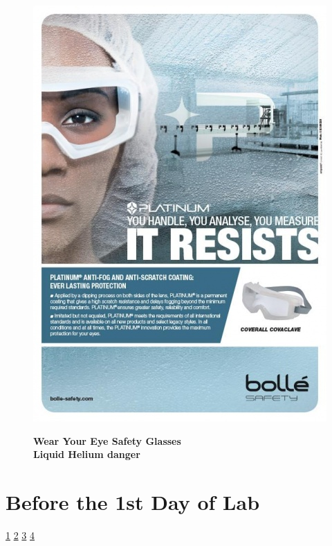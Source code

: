 \documentclass{../lab}
\begin{document}
\begin{figure}[H]
  \href{http://experimentationlab.berkeley.edu/sites/default/files/upimages/5_eye-wear-face.jpg}{\includegraphics[width=\linewidth,keepaspectratio]{images/5_eye-wear-face.jpg}} 
  
  \textbf{Wear Your Eye Safety Glasses \\ Liquid Helium danger}
  \label{fig:5_eye-wear-face.jpg}
\endminipage
\end{figure}

\section{Before the 1st Day of Lab}

\signatures \hyperlink{Hall Coefficient and Van der Pauw Method}{1} \hyperlink{Apparatus and Procedures}{2} \hyperlink{Extrapolating Data}{3} \hyperlink{Electron or Hole Concentrations}{4}
\end{document}

